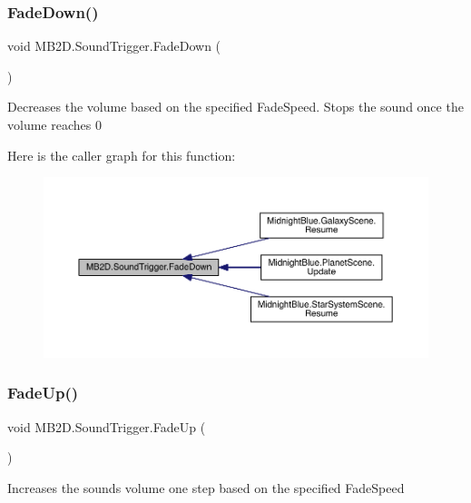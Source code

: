 \subsubsection{\texorpdfstring{Fade\+Down()}{FadeDown()}}
{\footnotesize\ttfamily void M\+B2\+D.\+Sound\+Trigger.\+Fade\+Down (\begin{DoxyParamCaption}{ }\end{DoxyParamCaption})\hspace{0.3cm}{\ttfamily [inline]}}



Decreases the volume based on the specified Fade\+Speed. Stops the sound once the volume reaches 0 

Here is the caller graph for this function\+:\nopagebreak
\begin{figure}[H]
\begin{center}
\leavevmode
\includegraphics[width=350pt]{class_m_b2_d_1_1_sound_trigger_aca40e191ef7b6cd594d43bb36ae787e9_icgraph}
\end{center}
\end{figure}
\hypertarget{class_m_b2_d_1_1_sound_trigger_a677d10464891b21b44da3811430d5bea}{}\label{class_m_b2_d_1_1_sound_trigger_a677d10464891b21b44da3811430d5bea} 
\subsubsection{\texorpdfstring{Fade\+Up()}{FadeUp()}}
{\footnotesize\ttfamily void M\+B2\+D.\+Sound\+Trigger.\+Fade\+Up (\begin{DoxyParamCaption}{ }\end{DoxyParamCaption})\hspace{0.3cm}{\ttfamily [inline]}}



Increases the sounds volume one step based on the specified Fade\+Speed 

